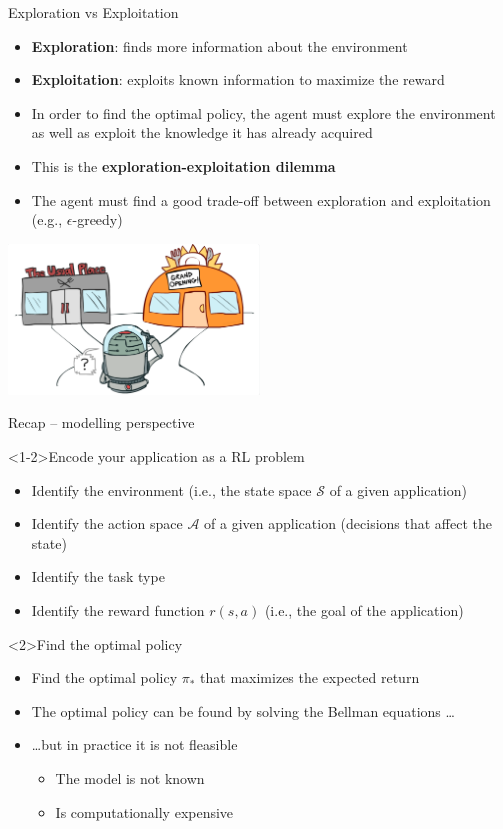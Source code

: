 \documentclass[presentation, 9pt]{beamer}\mode<presentation>{\usetheme{AMSBolognaFC}}
\begin{document}
\begin{frame}{Exploration vs Exploitation}
	\begin{itemize}
		\item \textbf{Exploration}: finds more information about the environment 
		\item \textbf{Exploitation}: exploits known information to maximize the reward 
		\item In order to find the optimal policy, the agent must explore the environment as well as exploit the knowledge it has already acquired
		\item This is the \textbf{exploration-exploitation dilemma}
		\item The agent must find a good trade-off between exploration and exploitation (e.g., $\epsilon$-greedy)
	\end{itemize}
\centering
\includegraphics[width=0.5\textwidth]{img/exploration-exploitation.png}
\end{frame}
\begin{frame}{Recap -- modelling perspective}
\begin{exampleblock}<1-2>{Encode your application as a RL problem}
\begin{itemize}
	\item Identify the environment (i.e., the state space $\mathcal{S}$ of a given application)
	\item Identify the action space $\mathcal{A}$ of a given application (decisions that affect the state)
	\item Identify the task type 
	\item Identify the reward function $r(s,a)$ (i.e., the goal of the application) 
\end{itemize}
\end{exampleblock}
\begin{alertblock}<2>{Find the optimal policy}
	\begin{itemize}
		\item Find the optimal policy $\pi_*$ that maximizes the expected return
		\item The optimal policy can be found by solving the Bellman equations \dots
		\item \dots but in practice it is not fleasible
		\begin{itemize}
			\item The model is not known
			\item Is computationally expensive
		\end{itemize}
	\end{itemize}
\end{alertblock}
\end{frame}
\end{document}

